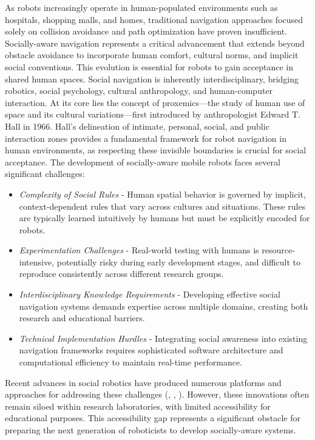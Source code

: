 As robots increasingly operate in human-populated environments such as hospitals, 
shopping malls, and homes, traditional navigation approaches focused solely on 
collision avoidance and path optimization have proven insufficient. 
Socially-aware navigation represents a critical advancement that extends 
beyond obstacle avoidance to incorporate human comfort, cultural norms, 
and implicit social conventions. This evolution is essential for robots to gain 
acceptance in shared human spaces.
Social navigation is inherently interdisciplinary, bridging robotics, social 
psychology, cultural anthropology, and human-computer interaction. At its core 
lies the concept of proxemics—the study of human use of space and its cultural 
variations—first introduced by anthropologist Edward T. Hall in 1966. Hall's 
delineation of intimate, personal, social, and public interaction zones provides 
a fundamental framework for robot navigation in human environments, as respecting 
these invisible boundaries is crucial for social acceptance.
The development of socially-aware mobile robots faces several significant challenges:
\begin{itemize}
    \item \textit{Complexity of Social Rules} - Human spatial behavior is governed by implicit, 
    context-dependent rules that vary across cultures and situations. These rules are 
    typically learned intuitively by humans but must be explicitly encoded for robots.
    \item \textit{Experimentation Challenges} - Real-world testing with humans is 
    resource-intensive, potentially risky during early development stages, and 
    difficult to reproduce consistently across different research groups.
    \item \textit{Interdisciplinary Knowledge Requirements} - Developing effective social navigation 
    systems demands expertise across multiple domains, creating both research and 
    educational barriers.
    \item \textit{Technical Implementation Hurdles} - Integrating social awareness into existing 
    navigation frameworks requires sophisticated software architecture and computational 
    efficiency to maintain real-time performance.
\end{itemize}

Recent advances in social robotics have produced numerous platforms and approaches for 
addressing these challenges (\cite{arenarosnav}, \cite{hunavsimros2human}, \cite{habitat}). 
However, these innovations often remain siloed within research laboratories, with limited 
accessibility for educational purposes. This accessibility gap represents a significant 
obstacle for preparing the next generation of roboticists to develop socially-aware systems.

